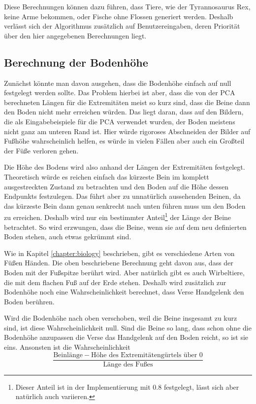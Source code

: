 Diese Berechnungen können dazu führen, dass Tiere, wie der Tyrannosaurus Rex, keine Arme bekommen, oder Fische ohne Flossen generiert werden. Deshalb verlässt sich der Algorithmus zusätzlich auf Benutzereingaben, deren Priorität über den hier angegebenen Berechnungen liegt.

\subsection{Berechnung der Bodenhöhe}
\label{floor_height}

Zunächst könnte man davon ausgehen, dass die Bodenhöhe einfach auf null festgelegt werden sollte. Das Problem hierbei ist aber, dass die von der PCA berechneten Längen für die Extremitäten meist so kurz sind, dass die Beine dann den Boden nicht mehr erreichen würden. Das liegt daran, dass auf den Bildern, die als Eingabebeispiele für die PCA verwendet wurden, der Boden meistens nicht ganz am unteren Rand ist. Hier würde rigoroses Abschneiden der Bilder auf Fußhöhe wahrscheinlich helfen, es würde in vielen Fällen aber auch ein Großteil der Füße verloren gehen.

Die Höhe des Bodens wird also anhand der Längen der Extremitäten festgelegt.
Theoretisch würde es reichen einfach das kürzeste Bein im komplett ausgestreckten Zustand zu betrachten und den Boden auf die Höhe dessen Endpunkts festzulegen.
Das führt aber zu unnatürlich aussehenden Beinen, da das kürzeste Bein dann genau senkrecht nach unten führen muss um den Boden zu erreichen.
Deshalb wird nur ein bestimmter Anteil\footnote{Dieser Anteil ist in der Implementierung mit $0.8$ festgelegt, lässt sich aber natürlich auch variieren.} der Länge der Beine betrachtet. So wird erzwungen, dass die Beine, wenn sie auf dem neu definierten Boden stehen, auch etwas gekrümmt sind.

Wie in Kapitel \ref{chapter:biology} beschrieben, gibt es verschiedene Arten von Füßen \bzw Händen. Die oben beschriebene Berechnung geht davon aus, dass der Boden mit der Fußspitze berührt wird. Aber natürlich gibt es auch Wirbeltiere, die mit dem flachen Fuß auf der Erde stehen.
Deshalb wird zusätzlich zur Bodenhöhe noch eine Wahrscheinlichkeit berechnet, dass Verse \bzw Handgelenk den Boden berühren.

Wird die Bodenhöhe nach oben verschoben, weil die Beine insgesamt zu kurz sind, ist diese Wahrscheinlichkeit null.
Sind die Beine so lang, dass schon ohne die Bodenhöhe anzupassen die Verse \bzw das Handgelenk auf den Boden reicht, so ist sie eins.
Ansonsten ist die Wahrscheinlichkeit 
\[\frac{\text{Beinlänge} - \text{Höhe des Extremitätengürtels über }0}{\text{Länge des Fußes}}\]


